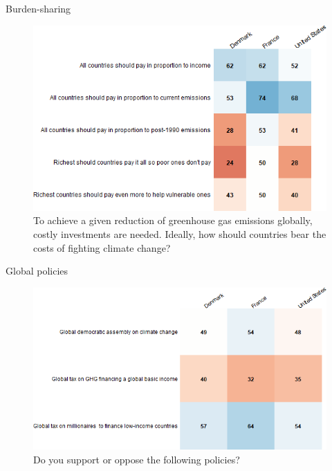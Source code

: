 \documentclass[aspectratio=169,9pt,dvipsnames]{beamer}
\begin{document}
\begin{frame}{Burden-sharing}%
\begin{figure}[h!]
\centering
\caption{To achieve a given reduction of greenhouse gas emissions globally, costly investments are needed.
Ideally, how should countries bear the costs of fighting climate change?}
\vspace{2mm}
\includegraphics[width=.6\textwidth]{../figures/country_comparison/burden_sharing_positive_countries.png}
\end{figure}
\end{frame}

\begin{frame}{Global policies}%
\begin{figure}[h!]
\centering
\caption{Do you support or oppose the following policies?}
\vspace{2mm}
\includegraphics[width=.6\textwidth]{../figures/country_comparison/global_policies_positive_countries.png}
\end{figure}
\end{frame}

\end{document}
